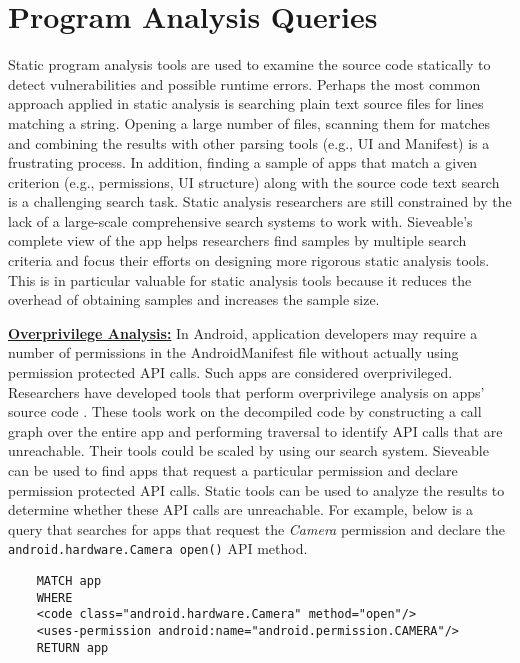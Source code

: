 \section{Program Analysis Queries}
Static program analysis tools are used to examine the source code statically to detect vulnerabilities and possible runtime errors.
Perhaps the most common approach applied in static analysis is searching plain text source files for lines matching a string.
Opening a large number of files, scanning them for matches and combining the results with other parsing tools (e.g., UI and Manifest) is a frustrating process. 
In addition, finding a sample of apps that match a given criterion (e.g., permissions, UI structure) along with the source code text search is a challenging search task.
Static analysis researchers are still constrained by the lack of a large-scale comprehensive search systems to work with.
Sieveable's complete view of the app helps researchers find samples by multiple search criteria and focus their efforts on designing more rigorous static analysis tools.
This is in particular valuable for static analysis tools because it reduces the overhead of obtaining samples and increases the sample size.

\underline{\textbf{Overprivilege Analysis:}}
In Android, application developers may require a number of permissions in the AndroidManifest file without actually using permission protected API calls. Such apps are considered overprivileged. 
Researchers have developed tools that perform overprivilege analysis on apps' source code \cite{felt2011android,au2012pscout}.
These tools work on the decompiled code by constructing a call graph over the entire app and performing traversal to identify API calls that are unreachable.
Their tools could be scaled by using our search system. 
Sieveable can be used to find apps that request a particular permission and declare permission protected API calls.
Static tools can be used to analyze the results to determine whether these API calls are unreachable.
For example, below is a query that searches for apps that request the \textit{Camera} permission and declare the \texttt{android.hardware.Camera open()} API method.

\begin{verbatim}
	MATCH app
	WHERE
	<code class="android.hardware.Camera" method="open"/>
	<uses-permission android:name="android.permission.CAMERA"/>
	RETURN app
\end{verbatim}

